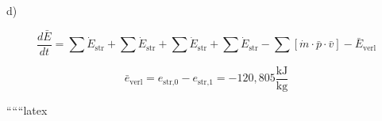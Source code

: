 d)

\[
\frac{d\bar{E}}{dt} = \sum \dot{E}_{\text{str}} + \sum \dot{E}_{\text{str}} + \sum \dot{E}_{\text{str}} + \sum \dot{E}_{\text{str}} - \sum \left[ \dot{m} \cdot \bar{p} \cdot \bar{v} \right] - \bar{E}_{\text{verl}}
\]

\[
\bar{e}_{\text{verl}} = e_{\text{str,0}} - e_{\text{str,1}} = -120,805 \frac{\text{kJ}}{\text{kg}}
\]

``````latex